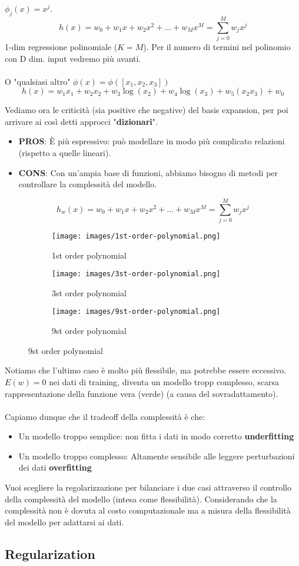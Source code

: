 \begin{example}
    [1-dim $x$] \hspace{15pt} $\phi_j(x) = x^j$.
    $$h(x) = w_0 + w_1x + w_2x^2 + \dots + w_Mx^M = \sum_{j=0}^{M}w_jx^j$$
    1-dim regressione polinomiale ($K=M$). Per il numero di termini nel polinomio con D dim. input vedremo più avanti.\\\\
    O "qualsiasi altro" $\phi(x) = \phi([x_1, x_2, x_3])$
    $$h(x) = w_1x_1 + w_2 x_2 + w_3 \log(x_2) + w_4\log(x_3) + w_5(x_2x_3) + w_0$$
\end{example}
\hspace{-15pt}Vediamo ora le criticità (sia positive che negative) del basis expansion, per poi arrivare 
ai così detti approcci "\textbf{dizionari}".
\begin{itemize}
    \item \textbf{PROS}: È più espressivo: può modellare in modo più complicato
    relazioni (rispetto a quelle lineari).
    \item \textbf{CONS}: Con un'ampia base di funzioni, abbiamo bisogno di metodi per
    controllare la complessità del modello.
\end{itemize}
$$h_w(x) = w_0 + w_1x + w_2x^2 + \dots + w_Mx^M = \sum_{j=0}^{M}w_jx^j$$
\newpage
\begin{figure}[h!]
    \centering
    \begin{subfigure}{.3\textwidth}
        \texttt{[image: images/1st-order-polynomial.png]}
        \caption{1st order polynomial}
    \end{subfigure}
    \begin{subfigure}{.3\textwidth}
        \texttt{[image: images/3st-order-polynomial.png]}
        \caption{3st order polynomial}
    \end{subfigure}
    \begin{subfigure}{.3\textwidth}
        \texttt{[image: images/9st-order-polynomial.png]}
        \caption{9st order polynomial}
    \end{subfigure}
\end{figure}

\hspace{-15pt}Notiamo che l'ultimo caso è molto più flessibile, ma potrebbe essere eccessivo. $E(w) = 0$ nei dati di training, diventa
un modello tropp complesso, scarsa rappresentazione della funzione vera (verde) (a causa del sovradattamento).\\\\
Capiamo dunque che il tradeoff della complessità è che:
\begin{itemize}
    \item Un modello troppo semplice: non fitta i dati in modo corretto \textbf{underfitting}
    \item Un modello troppo complesso: Altamente sensibile alle leggere perturbazioni dei dati \textbf{overfitting}
\end{itemize}
Vuoi scegliere la regolarizzazione per bilanciare i due casi attraverso il controllo della complessità del modello (intesa come flessibilità).
Considerando che la complessità non è dovuta al costo computazionale ma a misura della flessibilità del modello per adattarsi ai dati.

\subsection{Regularization}